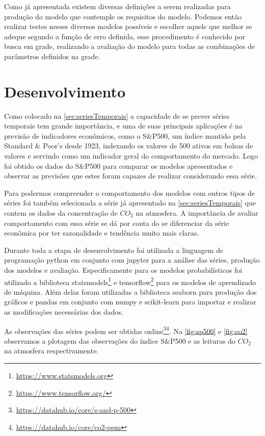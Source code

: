 \documentclass[
    12pt,
    oneside,
    a4paper,
    english,
    brazil
]{abntex2}
\begin{document}
Como  já  apresentada  existem  diversas definições  a  serem  realizadas  para
produção  do  modelo que  contemple  os  requisitos  do modelo.  Podemos  então
realizar testes nesses diversos modelos  possíveis e escolher aquele que melhor
se adeque segundo a função de  erro definida, esse procedimento é conhecido por
busca em grade,  realizando a avaliação do modelo para  todas as combinações de
parâmetros definidos na grade.

\chapter{Desenvolvimento}\label{chap:desenv}
Como colocado na \autoref{sec:seriesTemporais} a capacidade de se prever séries
temporais tem  grande importância,  e uma  de suas  principais aplicações  é na
previsão  de indicadores  econômicos, como  o S\&P500,  um índice  mantido pela
Standard \& Poor's desde 1923, indexando os  valores de 500 ativos em bolsas de
valores e  servindo como um indicador  geral do comportamento do  mercado. Logo
foi obtido os dados do S\&P500 para comparar os modelos apresentados e observar
as previsões que estes foram capazes de realizar considerando essa série.

Para   podermos   compreender   o   comportamento  dos   modelos   com   outros
tipos   de  séries   foi  também   selecionada  a   série  já   apresentado  na
\autoref{sec:seriesTemporais} que contem os dados  da concentração de $CO_2$ na
atmosfera. A  importância de  avaliar comportamento  com essa  série se  dá por
conta do  se diferenciar da  série econômica  por ter sazonalidade  e tendência
muito mais claras.

Durante  toda  a  etapa  de   desenvolvimento  foi  utilizada  a  linguagem  de
programação python em conjunto com jupyter  para a análise das séries, produção
dos modelos  e avaliação. Especificamente  para os modelos  probabilísticos foi
utilizado a  biblioteca statsmodels\footnote{\url{https://www.statsmodels.org}}
e  tensorflow\footnote{\url{https://www.tensorflow.org/}}  para os  modelos  de
aprendizado de máquina.  Além delas foram utilizadas a  biblioteca seaborn para
produção  dos gráficos  e  pandas em  conjunto com  numpy  e scikit-learn  para
importar e realizar as modificações necessárias dos dados.

As observações das séries podem ser obtidas
online\footnote{\url{https://datahub.io/core/s-and-p-500}}\footnote{\url{https://datahub.io/core/co2-ppm}}.
Na   \autoref{fig:sp500}  e   \autoref{fig:co2}  observamos   a  plotagem   das
observações  do   índice  S\&P500  e   as  leituras  do  $CO_2$   na  atmosfera
respectivamente.
\end{document}
